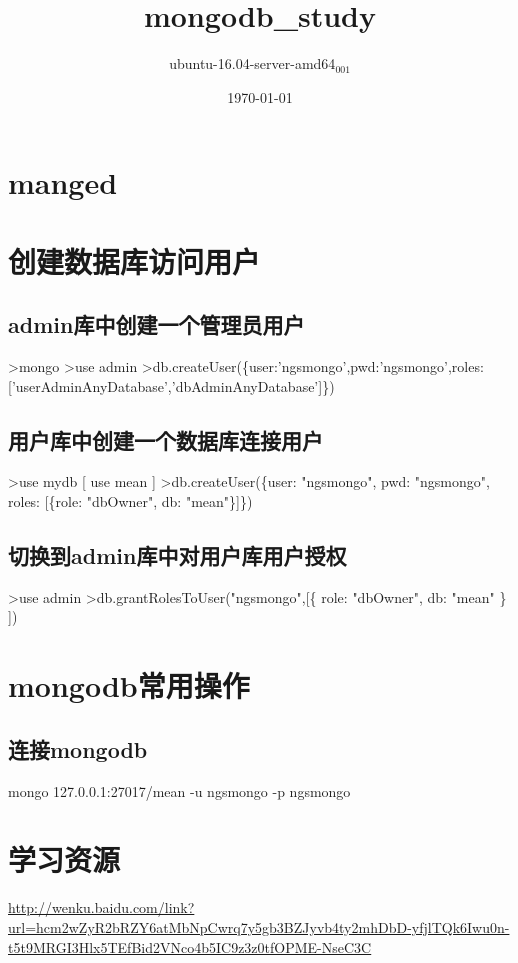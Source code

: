 \documentclass[11pt]{article}
\author{ubuntu-16.04-server-amd64$_{\text{001}}$}
\date{\today}
\title{mongodb\_study}
\begin{document}
\maketitle
\tableofcontents

\section{manged}
\label{sec-1}
\section{创建数据库访问用户}
\label{sec-2}
\subsection{admin库中创建一个管理员用户}
\label{sec-2-1}
>mongo
>use admin
>db.createUser(\{user:'ngsmongo',pwd:'ngsmongo',roles:['userAdminAnyDatabase','dbAdminAnyDatabase']\})

\subsection{用户库中创建一个数据库连接用户}
\label{sec-2-2}
>use mydb [ use mean ]
>db.createUser(\{user: "ngsmongo", pwd: "ngsmongo", roles: [\{role: "dbOwner", db: "mean"\}]\})

\subsection{切换到admin库中对用户库用户授权}
\label{sec-2-3}
>use admin
>db.grantRolesToUser("ngsmongo",[\{ role: "dbOwner", db: "mean" \} ])
\section{mongodb常用操作}
\label{sec-3}
\subsection{连接mongodb}
\label{sec-3-1}
mongo 127.0.0.1:27017/mean -u ngsmongo -p ngsmongo
\section{学习资源}
\label{sec-4}
\url{http://wenku.baidu.com/link?url=hcm2wZyR2bRZY6atMbNpCwrq7y5gb3BZJyvb4ty2mhDbD-yfjlTQk6Iwu0n-t5t9MRGI3Hlx5TEfBid2VNco4b5IC9z3z0tfOPME-NseC3C}
\end{document}

